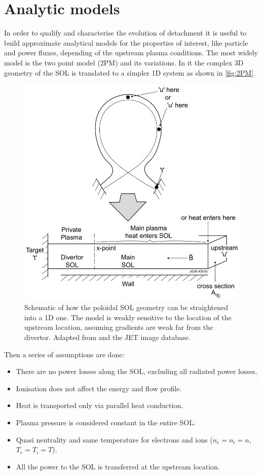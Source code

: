 \section{Analytic models}\label{Analytic models}

In order to qualify and characterise the evolution of detachment it is useful to build approximate analytical models for the properties of interest, like particle and power fluxes, depending of the upstream plasma conditions. The most widely model is the two point model (2PM) and its variations.\cite{HOBBS1966,Hobbs1967,Mahdavi1981,Keilhacker1982,Harbour1984,Lackner1984,Stangeby2001} In it the complex 3D geometry of the SOL is translated to a simpler 1D system as shown in \autoref{fig:2PM}.

\begin{figure}[!ht]
	\centering
	\includegraphics[trim={0 0 0 0},clip,width=0.65\linewidth]{Chapters/chapter1/figs/2PM.png}
	\caption{Schematic of how the poloidal SOL geometry can be straightened into a 1D one. The model is weakly sensitive to the location of the upstream location, assuming gradients are weak far from the divertor.\cite{Verhaegh2018} Adapted from \cite{Harrison2011} and the JET image database.}
	\label{fig:2PM}
\end{figure}

Then a series of assumptions are done:
\begin{itemize}
    \item There are no power losses along the SOL, excluding all radiated power losses.
    \item Ionisation does not affect the energy and flow profile.
    \item Heat is transported only via parallel heat conduction.
    \item Plasma pressure is considered constant in the entire SOL.
    \item Quasi neutrality and same temperature for electrons and ions ($n_e = n_i = n$, $T_e = T_i = T$).
    \item All the power to the SOL is transferred at the upstream location.
\end{itemize}

